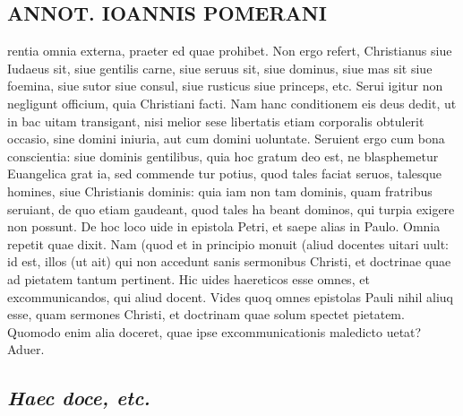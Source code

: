 \documentclass{article}
\begin{document}
\begin{pages}
\section*{ANNOT. IOANNIS POMERANI }\pstart rentia omnia externa, praeter ed quae prohibet. Non ergo refert, Christianus siue Iudaeus sit, siue gentilis carne, siue seruus sit, siue dominus, siue mas sit siue foemina, siue sutor siue consul, siue rusticus siue princeps, etc. Serui igitur non negligunt officium, quia Christiani facti. Nam hanc conditionem eis deus dedit, ut in bac uitam transigant, nisi melior sese libertatis etiam corporalis obtulerit occasio, sine domini iniuria, aut cum domini uoluntate. Seruient ergo cum bona conscientia: siue dominis gentilibus, quia hoc gratum deo est, ne blasphemetur Euangelica grat ia, sed commende tur potius, quod tales faciat seruos, talesque homines, siue Christianis dominis: quia iam non tam dominis, quam fratribus seruiant, de quo etiam gaudeant, quod tales ha beant dominos, qui turpia exigere non possunt. De hoc loco uide in epistola Petri, et saepe alias in Paulo.  \pend\pstart Omnia repetit quae dixit. Nam (quod et in principio monuit (aliud docentes uitari uult: id est, illos (ut ait) qui non accedunt sanis sermonibus Christi, et doctrinae quae ad pietatem tantum pertinent. Hic uides haereticos esse omnes, et excommunicandos, qui aliud docent. Vides quoq omnes epistolas Pauli nihil aliuq esse, quam sermones Christi, et doctrinam quae solum spectet pietatem. Quomodo enim alia doceret, quae ipse excommunicationis maledicto uetat? Aduer.  \pend
{}
{}
\subsection*{\textit{Haec doce, etc. }}

\end{pages}
\end{document}
